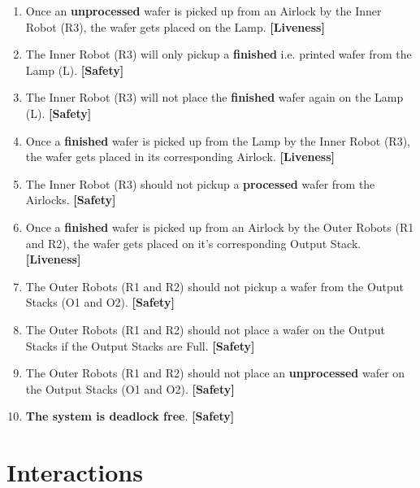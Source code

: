\documentclass[a4paper,12pt]{article}
\begin{document}
\begin{enumerate}
\begin{enumerate}
\end{enumerate}
\item Once an \textbf{unprocessed} wafer is picked up from an Airlock by the Inner Robot (R3), the wafer gets placed on the Lamp. \textbf{[Liveness]}
\item The Inner Robot (R3) will only pickup a \textbf{finished} i.e. printed wafer from the Lamp (L). \textbf{[Safety]}
\item The Inner Robot (R3) will not place the \textbf{finished} wafer again on the Lamp (L). \textbf{[Safety]}
\item Once a \textbf{finished} wafer is picked up from the Lamp by the Inner Robot (R3), the wafer gets placed in its corresponding Airlock. \textbf{[Liveness]}
\item The Inner Robot (R3) should not pickup a \textbf{processed} wafer from the Airlocks. \textbf{[Safety]}
\item Once a \textbf{finished} wafer is picked up from an Airlock by the Outer Robots (R1 and R2), the wafer gets placed on it's corresponding Output Stack. \textbf{[Liveness]}
\item The Outer Robots (R1 and R2) should not pickup a wafer from the Output Stacks (O1 and O2). \textbf{[Safety]}
\item The Outer Robots (R1 and R2) should not place a wafer on the Output Stacks if the Output Stacks are Full. \textbf{[Safety]}
\item The Outer Robots (R1 and R2) should not place an \textbf{unprocessed} wafer on the Output Stacks (O1 and O2). \textbf{[Safety]}
\item \textbf{The system is deadlock free}. \textbf{[Safety]}

\end{enumerate}

\newpage
\section{Interactions}
\end{document}

